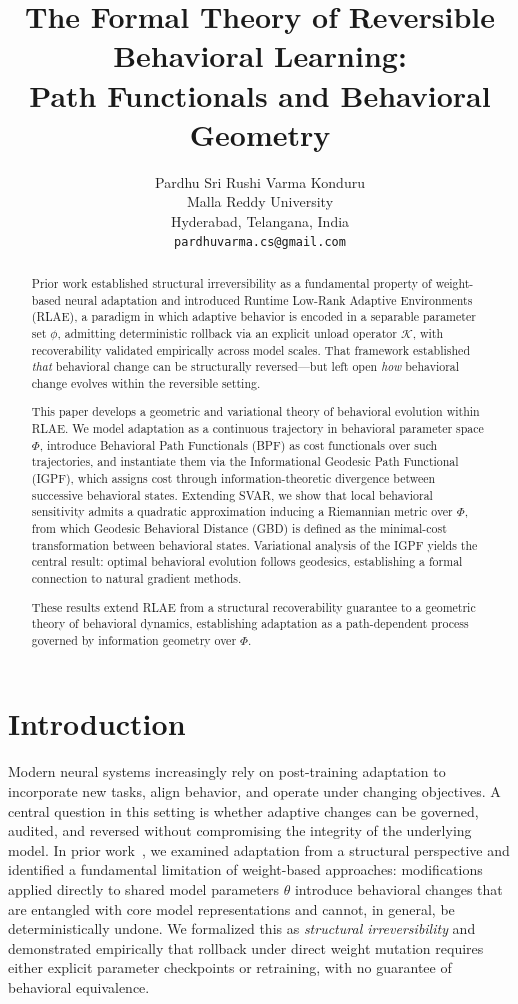 \documentclass{article}
\title{The Formal Theory of Reversible Behavioral Learning: \\
Path Functionals and Behavioral Geometry}
\author{Pardhu Sri Rushi Varma Konduru \\
    Malla Reddy University \\
    Hyderabad, Telangana, India \\
    \texttt{pardhuvarma.cs@gmail.com}
}
\begin{document}
\maketitle


\begin{abstract}
Prior work established structural irreversibility as a fundamental property of weight-based neural 
adaptation and introduced Runtime Low-Rank Adaptive Environments (RLAE), a paradigm in which 
adaptive behavior is encoded in a separable parameter set $\phi$, admitting deterministic rollback 
via an explicit unload operator $\mathcal{K}$, with recoverability validated empirically across 
model scales. That framework established \textit{that} behavioral change can be structurally 
reversed---but left open \textit{how} behavioral change evolves within the reversible setting.

This paper develops a geometric and variational theory of behavioral evolution within RLAE. We 
model adaptation as a continuous trajectory in behavioral parameter space $\Phi$, introduce 
Behavioral Path Functionals (BPF) as cost functionals over such trajectories, and instantiate 
them via the Informational Geodesic Path Functional (IGPF), which assigns cost through 
information-theoretic divergence between successive behavioral states. Extending SVAR, we show 
that local behavioral sensitivity admits a quadratic approximation inducing a Riemannian metric 
over $\Phi$, from which Geodesic Behavioral Distance (GBD) is defined as the minimal-cost 
transformation between behavioral states. Variational analysis of the IGPF yields the central 
result: optimal behavioral evolution follows geodesics, establishing a formal connection to natural 
gradient methods.

These results extend RLAE from a structural recoverability guarantee to a geometric theory of 
behavioral dynamics, establishing adaptation as a path-dependent process governed by information 
geometry over $\Phi$.
\end{abstract}


\section{Introduction}\label{section-introduction}

Modern neural systems increasingly rely on post-training adaptation to incorporate new tasks,
align behavior, and operate under changing objectives. A central question in this setting is
whether adaptive changes can be governed, audited, and reversed without compromising the
integrity of the underlying model. In prior work~\cite{konduru2026structurallimitationsweightbasedneural}, we examined adaptation
from a structural perspective and identified a fundamental limitation of weight-based approaches:
modifications applied directly to shared model parameters $\theta$ introduce behavioral changes
that are entangled with core model representations and cannot, in general, be deterministically
undone. We formalized this as \textit{structural irreversibility} and demonstrated empirically
that rollback under direct weight mutation requires either explicit parameter checkpoints or
retraining, with no guarantee of behavioral equivalence.
\end{document}
